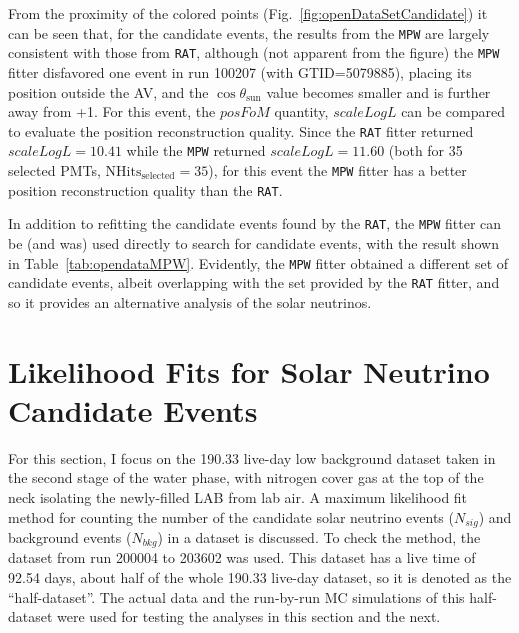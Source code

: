 From the proximity of the colored points (Fig.~\ref{fig:openDataSetCandidate}) it can be seen that, for the candidate events, the results from the \texttt{MPW} are largely consistent with those from \texttt{RAT}, although (not apparent from the figure) the \texttt{MPW} fitter disfavored one event in run 100207 (with GTID=5079885), placing its position outside the AV, and the $\cos\theta_\mathrm{sun}$ value becomes smaller and is further away from +1. For this event, the $posFoM$ quantity, $scaleLogL$ can be compared to evaluate the position reconstruction quality. Since the \texttt{RAT} fitter returned $scaleLogL=10.41$ while the \texttt{MPW} returned $scaleLogL=11.60$ (both for 35 selected PMTs, $\mathrm{NHits_{selected}}=35$), for this event the \texttt{MPW} fitter has a better position reconstruction quality than the \texttt{RAT}.

In addition to refitting the candidate events found by the \texttt{RAT}, the \texttt{MPW} fitter can be (and was) used directly to search for candidate events, with the result shown in Table~\ref{tab:opendataMPW}. Evidently, the \texttt{MPW} fitter obtained a different set of candidate events, albeit overlapping with the set provided by the \texttt{RAT} fitter, and so it provides an alternative analysis of the solar neutrinos.

\section{Likelihood Fits for Solar Neutrino Candidate Events}\label{sect:likelihoodFitsSolarNu}

For this section, I focus on the 190.33 live-day low background dataset taken in the second stage of the water phase, with nitrogen cover gas at the top of the neck isolating the newly-filled LAB from lab air. A maximum likelihood fit method for counting the number of the candidate solar neutrino events ($N_{sig}$) and background events ($N_{bkg}$) in a dataset is discussed. To check the method, the dataset from run 200004 to 203602 was used. This dataset has a live time of 92.54 days, about half of the whole 190.33 live-day dataset, so it is denoted as the ``half-dataset''. The actual data and the run-by-run MC simulations of this half-dataset were used for testing the analyses in this section and the next.

